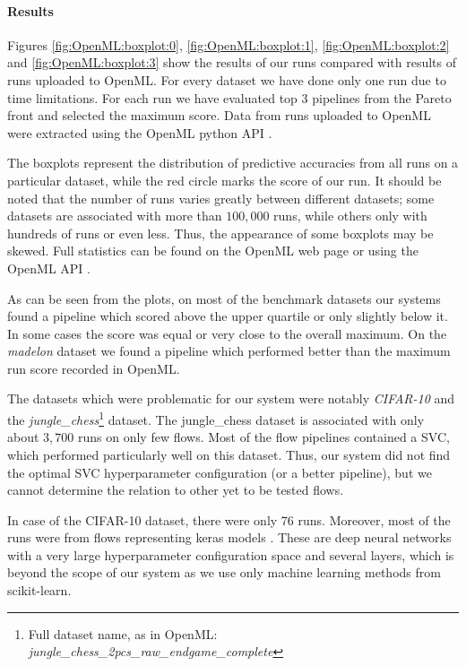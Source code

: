 \paragraph{Results}
Figures \ref{fig:OpenML:boxplot:0}, \ref{fig:OpenML:boxplot:1},
\ref{fig:OpenML:boxplot:2} and \ref{fig:OpenML:boxplot:3} show the results
of our runs compared with results of runs uploaded to OpenML. For every dataset
we have done only one run due to time limitations. For each run we have
evaluated top 3 pipelines from the Pareto front and selected the maximum score.
Data from runs uploaded to OpenML were extracted using the OpenML python API
\citep{openmlcc18api}.

The boxplots represent the distribution of predictive accuracies from all runs
on a particular dataset, while the red circle marks the score of our run.
It should be noted that the number of runs varies
greatly between different datasets; some datasets are associated with more
than $100,000$ runs, while others only with hundreds of runs or even less. Thus,
the appearance of some boxplots may be skewed. Full statistics can be found on
the OpenML web page or using the OpenML API \citep{openmlcc18, openmlcc18docs}.

As can be seen from the plots, on most of the benchmark datasets our systems
found a pipeline which scored above the upper quartile or only slightly below
it. In some cases the score was equal or very close to the overall maximum. On
the \emph{madelon} dataset we found a pipeline which performed better than the
maximum run score recorded in OpenML.

The datasets which were problematic for our system were notably \emph{CIFAR-10} and
the \emph{jungle\_chess}\footnote{Full dataset name, as in OpenML:
\emph{jungle\_chess\_2pcs\_raw\_endgame\_complete}} dataset.
The jungle\_chess dataset is associated with only
about $3,700$ runs on only few flows. Most of the flow pipelines contained a
SVC, which performed particularly well on this dataset. Thus, our system did
not find the optimal SVC hyperparameter configuration (or a better pipeline),
but we cannot determine the relation to other yet to be tested flows.

In case of the CIFAR-10 dataset, there were only 76 runs. Moreover, most of the
runs were from flows representing keras models \citep{chollet2015keras}. These
are deep neural networks with a very large hyperparameter configuration space
and several layers, which is beyond the scope of our system as we use only
machine learning methods from scikit-learn.

